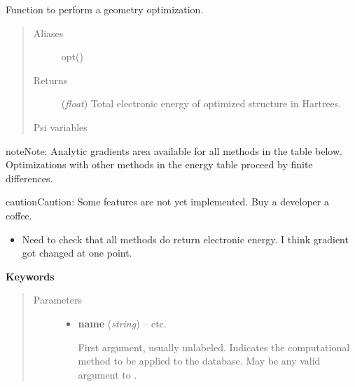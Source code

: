 \documentclass[letterpaper,10pt,english]{sphinxmanual}
\begin{document}
\begin{fulllineitems}
\label{index:driver.optimize}
Function to perform a geometry optimization.
\begin{quote}\begin{description}
\item[{Aliases }] \leavevmode
opt()

\item[{Returns}] \leavevmode
(\emph{float}) Total electronic energy of optimized structure in Hartrees.

\item[{Psi variables}] \leavevmode
\end{description}\end{quote}

\begin{fulllineitems}
\label{index:envvar-CURRENTENERGY}
\end{fulllineitems}


\begin{notice}{note}{Note:}
Analytic gradients area available for all methods in the table
below. Optimizations with other methods in the energy table proceed
by finite differences.
\end{notice}

\begin{notice}{caution}{Caution:}
Some features are not yet implemented. Buy a developer a coffee.
\begin{itemize}
\item {} 
Need to check that all methods do return electronic energy. I think gradient got changed at one point.

\end{itemize}
\end{notice}

\textbf{Keywords}
\begin{quote}\begin{description}
\item[{Parameters}] \leavevmode\begin{itemize}
\item {} 
\textbf{name} (\emph{string}) -- 
 \textbar{}\textbar{}  \textbar{}\textbar{}  \textbar{}\textbar{} etc.

First argument, usually unlabeled. Indicates the computational method 
to be applied to the database. May be any valid argument to 
{\hyperref[index:driver.energy]{}}.



\end{itemize}
\end{description}
\end{quote}
\end{fulllineitems}
\end{document}
